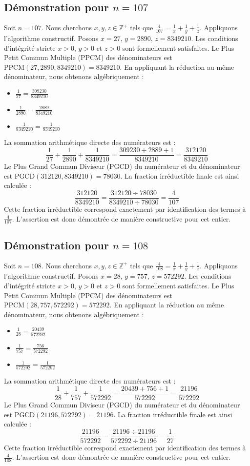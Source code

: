 \documentclass[11pt,a4paper]{article}
\begin{document}
\subsection{Démonstration pour $n = 107$}
Soit $n = 107$. Nous cherchons $x, y, z \in \mathbb{Z}^{+}$ tels que $\frac{4}{107} = \frac{1}{x} + \frac{1}{y} + \frac{1}{z}$.
Appliquons l'algorithme constructif. Posons $x = 27$, $y = 2890$, $z = 8349210$.
Les conditions d'intégrité stricte $x > 0$, $y > 0$ et $z > 0$ sont formellement satisfaites.
Le Plus Petit Commun Multiple (PPCM) des dénominateurs est $\text{PPCM}(27, 2890, 8349210) = 8349210$.
En appliquant la réduction au même dénominateur, nous obtenons algébriquement :
\begin{itemize}
    \item $\frac{1}{27} = \frac{309230}{8349210}$
    \item $\frac{1}{2890} = \frac{2889}{8349210}$
    \item $\frac{1}{8349210} = \frac{1}{8349210}$
\end{itemize}
La sommation arithmétique directe des numérateurs est :
$$ \frac{1}{27} + \frac{1}{2890} + \frac{1}{8349210} = \frac{309230 + 2889 + 1}{8349210} = \frac{312120}{8349210} $$
Le Plus Grand Commun Diviseur (PGCD) du numérateur et du dénominateur est $\text{PGCD}(312120, 8349210) = 78030$.
La fraction irréductible finale est ainsi calculée :
$$ \frac{312120}{8349210} = \frac{312120 \div 78030}{8349210 \div 78030} = \frac{4}{107} $$
Cette fraction irréductible correspond exactement par identification des termes à $\frac{4}{107}$. L'assertion est donc démontrée de manière constructive pour cet entier.

\subsection{Démonstration pour $n = 108$}
Soit $n = 108$. Nous cherchons $x, y, z \in \mathbb{Z}^{+}$ tels que $\frac{4}{108} = \frac{1}{x} + \frac{1}{y} + \frac{1}{z}$.
Appliquons l'algorithme constructif. Posons $x = 28$, $y = 757$, $z = 572292$.
Les conditions d'intégrité stricte $x > 0$, $y > 0$ et $z > 0$ sont formellement satisfaites.
Le Plus Petit Commun Multiple (PPCM) des dénominateurs est $\text{PPCM}(28, 757, 572292) = 572292$.
En appliquant la réduction au même dénominateur, nous obtenons algébriquement :
\begin{itemize}
    \item $\frac{1}{28} = \frac{20439}{572292}$
    \item $\frac{1}{757} = \frac{756}{572292}$
    \item $\frac{1}{572292} = \frac{1}{572292}$
\end{itemize}
La sommation arithmétique directe des numérateurs est :
$$ \frac{1}{28} + \frac{1}{757} + \frac{1}{572292} = \frac{20439 + 756 + 1}{572292} = \frac{21196}{572292} $$
Le Plus Grand Commun Diviseur (PGCD) du numérateur et du dénominateur est $\text{PGCD}(21196, 572292) = 21196$.
La fraction irréductible finale est ainsi calculée :
$$ \frac{21196}{572292} = \frac{21196 \div 21196}{572292 \div 21196} = \frac{1}{27} $$
Cette fraction irréductible correspond exactement par identification des termes à $\frac{4}{108}$. L'assertion est donc démontrée de manière constructive pour cet entier.
\end{document}
